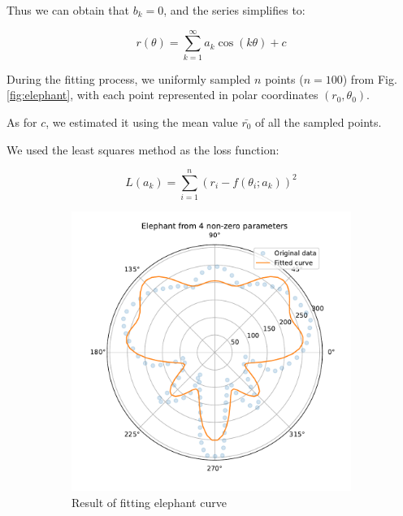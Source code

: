 \documentclass{article}
\begin{document}
Thus we can obtain that $b_k = 0$, and the series simplifies to:

$$
r(\theta) = \sum_{k=1}^{\infty} a_k \cos(k\theta) + c
$$


During the fitting process, we uniformly sampled $ n $ points ($ n = 100 $) from Fig. \ref{fig:elephant}, with each point represented in polar coordinates $(r_0, \theta_0)$.

As for $ c $, we estimated it using the mean value $\bar{r_0}$ of all the sampled points.

We used the least squares method as the loss function:

$$
L(a_k) = \sum_{i=1}^{n} \left( r_i - f(\theta_i; a_k) \right)^2
$$

\begin{figure}[h]
	\centering
	\begin{subfigure}[b]{0.49\linewidth}
		\centering
		\includegraphics[width=\linewidth]{elephant.pdf}
		\caption{Result of fitting elephant curve}
	\end{subfigure}
	\hfill
	\begin{subfigure}[b]{0.49\linewidth}
		\centering

\end{subfigure}
\end{figure}
\end{document}
